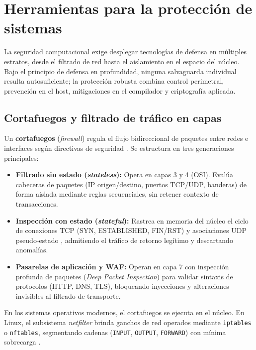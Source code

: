 \documentclass[12pt]{article}
\begin{document}
\section{Herramientas para la protección de sistemas}\label{sec:herramientasProteccionSistemas}

La seguridad computacional exige desplegar tecnologías de defensa en múltiples estratos, desde el filtrado de red hasta el aislamiento en el espacio del núcleo. Bajo el principio de defensa en profundidad, ninguna salvaguarda individual resulta autosuficiente; la protección robusta combina control perimetral, prevención en el host, mitigaciones en el compilador y criptografía aplicada.

\subsection{Cortafuegos y filtrado de tráfico en capas}\label{subsec:cortafuegosFiltradoTrafico}

Un \textbf{cortafuegos} (\textit{firewall}) regula el flujo bidireccional de paquetes entre redes e interfaces según directivas de seguridad \parencite[\S 19.6.1, p.\ 939]{deitel2004operating}. Se estructura en tres generaciones principales:
\begin{itemize}[noitemsep, topsep=2pt]
    \item \textbf{Filtrado sin estado (\textit{stateless}):} Opera en capas 3 y 4 (OSI). Evalúa cabeceras de paquetes (IP origen/destino, puertos TCP/UDP, banderas) de forma aislada mediante reglas secuenciales, sin retener contexto de transacciones.
    \item \textbf{Inspección con estado (\textit{stateful}):} Rastrea en memoria del núcleo el ciclo de conexiones TCP (SYN, ESTABLISHED, FIN/RST) y asociaciones UDP pseudo-estado \parencite[\S 19.6.1, p.\ 940]{deitel2004operating}, admitiendo el tráfico de retorno legítimo y descartando anomalías.
    \item \textbf{Pasarelas de aplicación y WAF:} Operan en capa 7 con inspección profunda de paquetes (\textit{Deep Packet Inspection}) para validar sintaxis de protocolos (HTTP, DNS, TLS), bloqueando inyecciones y alteraciones invisibles al filtrado de transporte.
\end{itemize}

En los sistemas operativos modernos, el cortafuegos se ejecuta en el núcleo. En Linux, el subsistema \textit{netfilter} brinda ganchos de red operados mediante \texttt{iptables} o \texttt{nftables}, segmentando cadenas (\texttt{INPUT}, \texttt{OUTPUT}, \texttt{FORWARD}) con mínima sobrecarga \parencite[\S 15.7, p.\ 546]{silberschatz2006fundamentos}.
\end{document}
